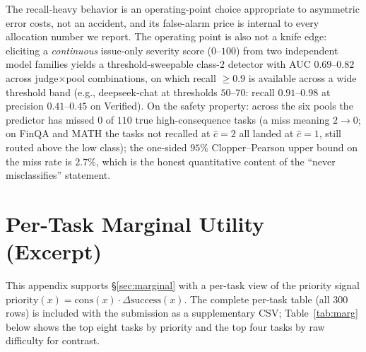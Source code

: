 \documentclass{article}
\begin{document}
The recall-heavy behavior is an operating-point choice appropriate to
asymmetric error costs, not an accident, and its false-alarm price is
internal to every allocation number we report. The operating point is
also not a knife edge: eliciting a \emph{continuous} issue-only
severity score ($0$--$100$) from two independent model families yields
a threshold-sweepable class-$2$ detector with AUC $0.69$--$0.82$
across judge$\times$pool combinations, on which recall $\ge 0.9$ is
available across a wide threshold band (e.g., deepseek-chat at
thresholds $50$--$70$: recall $0.91$--$0.98$ at precision
$0.41$--$0.45$ on Verified). On the safety
property: across the six pools the predictor has missed $0$ of
$110$ true high-consequence tasks (a miss meaning $2{\to}0$; on
FinQA and MATH the tasks not recalled at $\hat{c}{=}2$ all landed at
$\hat{c}{=}1$, still routed above the low class); the one-sided
$95\%$ Clopper--Pearson upper bound on the miss rate is $2.7\%$,
which is the honest quantitative content of the ``never
misclassifies'' statement.

\section{Per-Task Marginal Utility (Excerpt)}
\label{app:marginal}

This appendix supports \S\ref{sec:marginal} with a per-task view of
the priority signal
$\mathrm{priority}(x) = \mathrm{cons}(x) \cdot
\Delta\mathrm{success}(x)$. The complete per-task table (all $300$
rows) is included with the submission as a supplementary CSV;
Table~\ref{tab:marg} below shows the top eight tasks by priority and
the top four tasks by raw difficulty for contrast.
\end{document}
